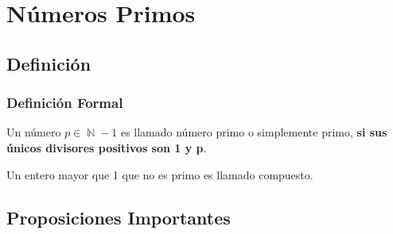 \documentclass[12pt, fleqn]{report}                             %
\DeclareMathOperator \Naturals  {\mathbb{N}}                     %
\begin{document}
\chapter{Números Primos}
    \clearpage

     

    \clearpage
    \section{Definición}

        \subsection*{Definición Formal}

            Un número $p \in \Naturals - {1}$ es llamado número primo o simplemente
            primo, \textbf{si sus únicos divisores positivos son 1 y p}.

            Un entero mayor que 1 que no es primo es llamado compuesto.

         
    \section{Proposiciones Importantes}
\end{document}
